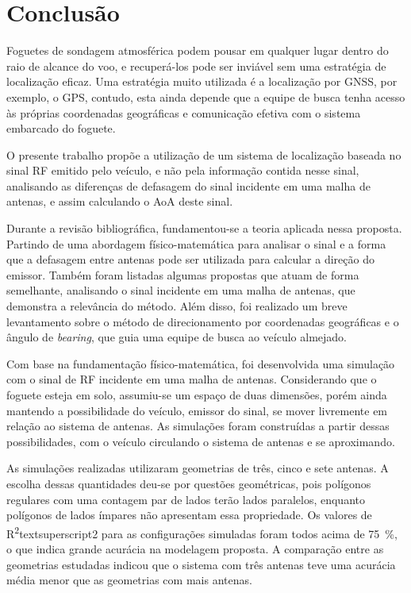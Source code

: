 \chapter{Conclusão}\label{cap:conclusao}

Foguetes de sondagem atmosférica podem pousar em qualquer lugar dentro do raio de alcance do voo, e recuperá-los pode ser inviável sem uma estratégia de localização eficaz.
Uma estratégia muito utilizada é a localização por \ac{GNSS}, por exemplo, o \ac{GPS}, contudo, esta ainda depende que a equipe de busca tenha acesso às próprias coordenadas geográficas e comunicação efetiva com o sistema embarcado do foguete.

O presente trabalho propõe a utilização de um sistema de localização baseada no sinal \ac{RF} emitido pelo veículo, e não pela informação contida nesse sinal, analisando as diferenças de defasagem do sinal incidente em uma malha de antenas, e assim calculando o \ac{AoA} deste sinal.

Durante a revisão bibliográfica, fundamentou-se a teoria aplicada nessa proposta.
Partindo de uma abordagem físico-matemática para analisar o sinal e a forma que a defasagem entre antenas pode ser utilizada para calcular a direção do emissor.
Também foram listadas algumas propostas que atuam de forma semelhante, analisando o sinal incidente em uma malha de antenas, que demonstra a relevância do método.
Além disso, foi realizado um breve levantamento sobre o método de direcionamento por coordenadas geográficas e o ângulo de \textit{bearing}, que guia uma equipe de busca ao veículo almejado.

Com base na fundamentação físico-matemática, foi desenvolvida uma simulação com o sinal de \ac{RF} incidente em uma malha de antenas.
Considerando que o foguete esteja em solo, assumiu-se um espaço de duas dimensões, porém ainda mantendo a possibilidade do veículo, emissor do sinal, se mover livremente em relação ao sistema de antenas.
As simulações foram construídas a partir dessas possibilidades, com o veículo circulando o sistema de antenas e se aproximando.

As simulações realizadas utilizaram geometrias de três, cinco e sete antenas.
A escolha dessas quantidades deu-se por questões geométricas, pois polígonos regulares com uma contagem par de lados terão lados paralelos, enquanto polígonos de lados ímpares não apresentam essa propriedade.
Os valores de R\textsuperscript{2}textsuperscript{2} para as configurações simuladas foram todos acima de \qty{75}{\percent}, o que indica grande acurácia na modelagem proposta.
A comparação entre as geometrias estudadas indicou que o sistema com três antenas teve uma acurácia média menor que as geometrias com mais antenas.

